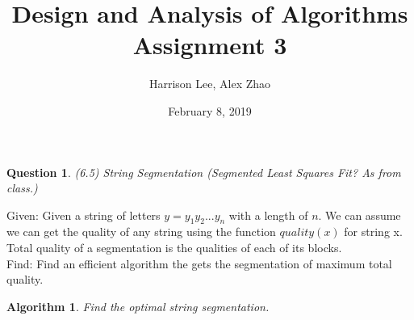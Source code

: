 \documentclass[11pt, oneside]{article}   	%
\title {Design and Analysis of Algorithms Assignment 3}
\author{Harrison Lee, Alex Zhao}
\date{February 8, 2019}
\newtheorem{Question}{Question}
\newtheorem{Algorithm}{Algorithm}
\begin{document}
\maketitle

\begin{Question} (6.5) String Segmentation (Segmented Least Squares Fit? As from class.)
\end{Question}

\noindent Given: Given a string of letters $y = y_1 y_2 ... y_n$ with a length of $n$. We can assume we can get the quality of any string using the function $quality(x)$ for string x. Total quality of a segmentation is the qualities of each of its blocks.\\

\noindent Find: Find an efficient algorithm the gets the segmentation of maximum total quality. \\

\begin{Algorithm}
Find the optimal string segmentation.
\end{Algorithm}
\end{document}
